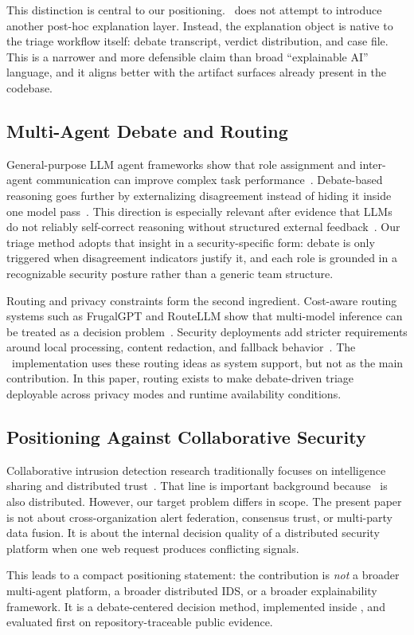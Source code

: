 This distinction is central to our positioning. \system\ does not attempt to introduce another post-hoc explanation layer. Instead, the explanation object is native to the triage workflow itself: debate transcript, verdict distribution, and case file. This is a narrower and more defensible claim than broad ``explainable AI'' language, and it aligns better with the artifact surfaces already present in the codebase.

\subsection{Multi-Agent Debate and Routing}

General-purpose LLM agent frameworks show that role assignment and inter-agent communication can improve complex task performance~\cite{wang2024autonomous,wu2024autogen,hong2024metagpt}. Debate-based reasoning goes further by externalizing disagreement instead of hiding it inside one model pass~\cite{du2024debate}. This direction is especially relevant after evidence that LLMs do not reliably self-correct reasoning without structured external feedback~\cite{huang2024selfcorrect,gou2024critic}. Our triage method adopts that insight in a security-specific form: debate is only triggered when disagreement indicators justify it, and each role is grounded in a recognizable security posture rather than a generic team structure.

Routing and privacy constraints form the second ingredient. Cost-aware routing systems such as FrugalGPT and RouteLLM show that multi-model inference can be treated as a decision problem~\cite{chen2023frugalgpt,ong2024routellm}. Security deployments add stricter requirements around local processing, content redaction, and fallback behavior~\cite{chen2025privacy}. The \system\ implementation uses these routing ideas as system support, but not as the main contribution. In this paper, routing exists to make debate-driven triage deployable across privacy modes and runtime availability conditions.

\subsection{Positioning Against Collaborative Security}

Collaborative intrusion detection research traditionally focuses on intelligence sharing and distributed trust~\cite{vasilomanolakis2016taxonomy}. That line is important background because \system\ is also distributed. However, our target problem differs in scope. The present paper is not about cross-organization alert federation, consensus trust, or multi-party data fusion. It is about the internal decision quality of a distributed security platform when one web request produces conflicting signals.

This leads to a compact positioning statement: the contribution is \emph{not} a broader multi-agent platform, a broader distributed IDS, or a broader explainability framework. It is a debate-centered decision method, implemented inside \system, and evaluated first on repository-traceable public evidence.
